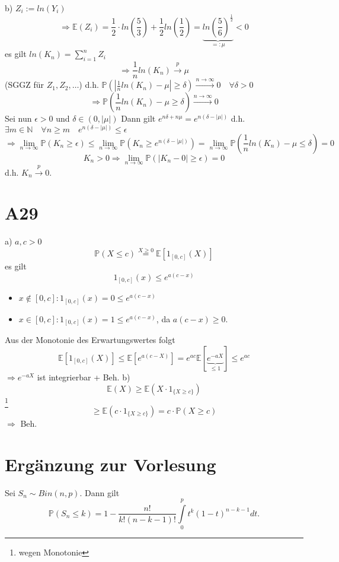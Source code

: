 \documentclass[a4paper,11pt,notitlepage]{report}
\newcommand{\N}{{\ensuremath{\mathbb{N}}}}
\newcommand{\Prim}{{\ensuremath{\mathbb{P}}}}
\newcommand{\E}{{\ensuremath{\mathbb{E}}}}
\begin{document}
b) $Z_i := ln(Y_i)$
$$\Rightarrow \E(Z_i) = \frac{1}{2} \cdot ln \left(\frac{5}{3} \right) + \frac{1}{2} ln \left( \frac{1}{2} \right ) = \underbrace{ln \left (\frac{5}{6} \right)^{\frac{1}{2}}}_{=: \mu} < 0$$
es gilt $ln(K_n) = \sum\limits_{i=1}^n{Z_i}$
$$\Rightarrow \frac{1}{n} ln(K_n) \overset{p}{\rightarrow} \mu$$ (SGGZ für $Z_1, Z_2, \ldots$)
\newline
d.h. $\Prim(|\frac{1}{n} ln(K_n) - \mu| \geq \delta) \overset{n \rightarrow \infty}{\rightarrow} 0 \quad \forall \delta > 0$
$$\Rightarrow \Prim(\frac{1}{n}ln(K_n) - \mu \geq \delta) \overset{n \rightarrow \infty}{\rightarrow} 0$$
Sei nun $\epsilon > 0$ und $\delta \in (0, |\mu|)$
\newline
Dann gilt $e^{n \delta + n \mu} = e^{n(\delta - |\mu|)}$
\newline
d.h. $\exists m \in \N \quad \forall n \geq m \quad e^{n(\delta - |\mu|)} \leq \epsilon$
$$\Rightarrow \lim\limits_{n \rightarrow \infty}{\Prim(K_n \geq \epsilon)} \leq \lim\limits_{n \rightarrow \infty}{\Prim(K_n \geq e^{n(\delta - |\mu|)})} = \lim\limits_{n \rightarrow \infty}{\Prim(\frac{1}{n} ln(K_n)- \mu \leq \delta)} = 0$$
$$K_n > 0 \Rightarrow \lim\limits_{n \rightarrow \infty}{\Prim(|K_n - 0| \geq \epsilon)} = 0$$
d.h. $K_n \overset{p}{\rightarrow} 0.$

\section{A29}
a) $a,c > 0$
$$\Prim(X \leq c) \overset{X \geq 0}{=} \E[1_{[0,c]}(X)]$$
es gilt
$$1_{[0,c]}(x) \leq e^{a(c-x)}$$

\begin{itemize}
	\item $x \notin [0,c] \colon 1_{[0,c]}(x) = 0 \leq e^{a(c-x)}$
	\item $x \in [0,c] \colon 1_{[0,c]}(x) = 1 \leq e^{a(c-x)}$, da $a(c-x) \geq 0.$
\end{itemize}

Aus der Monotonie des Erwartungswertes folgt
$$\E[1_{[0,c]}(X)] \leq \E[e^{a(c-X)}] = e^{ac} \E[\underbrace{e^{-aX}}_{\leq 1}] \leq e^{ac}$$
$\Rightarrow e^{-aX}$ ist integrierbar + Beh.
\newline
b) $$\E (X) \geq \E(X \cdot 1_{\{X \geq c\}})$$ \footnote{wegen Monotonie}
$$\geq \E(c \cdot 1_{\{X \geq c\}}) = c \cdot \Prim(X \geq c)$$
$\Rightarrow$ Beh.

\section{Ergänzung zur Vorlesung}
Sei $S_n \sim Bin(n,p)$. Dann gilt
$$\Prim(S_n \leq k) = 1- \frac{n!}{k! (n-k-1)!} \int\limits_{0}^p{t^k (1-t)^{n-k-1} dt.}$$
\end{document}
